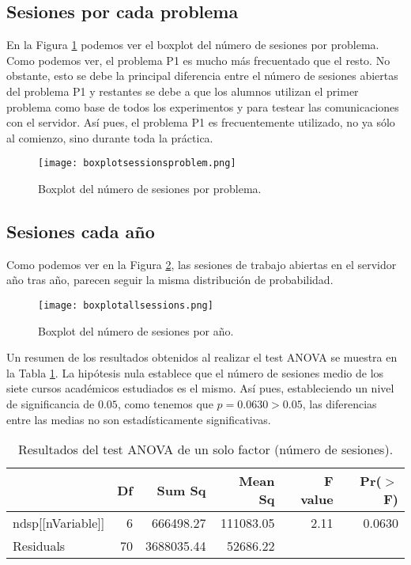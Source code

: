 \subsection{Sesiones por cada problema}

En la Figura \ref{fig:boxplotsessionsproblem} podemos ver el boxplot del número de sesiones por problema. Como podemos ver, el problema P1 es mucho más frecuentado que el resto. No obstante, esto se debe la principal diferencia entre el número de sesiones abiertas del problema P1 y restantes se debe a que los alumnos utilizan el primer problema como base de todos los experimentos y para testear las comunicaciones con el servidor. Así pues, el problema P1 es frecuentemente utilizado, no ya sólo al comienzo, sino durante toda la práctica.

\begin{figure}[H]
    \centering
    \texttt{[image: boxplotsessionsproblem.png]}
    \caption{Boxplot del número de sesiones por problema.}
    \label{fig:boxplotsessionsproblem}
\end{figure}

\subsection{Sesiones cada año}\label{sec:ANOVANumSessions}

Como podemos ver en la Figura \ref{fig:boxplotsessionsyear}, las sesiones de trabajo abiertas en el servidor año tras año, parecen seguir la misma distribución de probabilidad.

\begin{figure}[H]
    \centering
    \texttt{[image: boxplotallsessions.png]}
    \caption{Boxplot del número de sesiones por año.}
    \label{fig:boxplotsessionsyear}
\end{figure}

Un resumen de los resultados obtenidos al realizar el test ANOVA se muestra en la Tabla \ref{tab:ANOVAnumsessions}. La hipótesis nula establece que el número de sesiones medio de los siete cursos académicos estudiados es el mismo. Así pues, estableciendo un nivel de significancia de $0.05$, como tenemos que $p = 0.0630 > 0.05$, las diferencias entre las medias no son estadísticamente significativas.

\begin{table}[H]
\centering
\caption{Resultados del test ANOVA de un solo factor (número de sesiones).}
\label{tab:ANOVAnumsessions}
\begin{tabular}{lrrrrr}
  \hline
 & Df & Sum Sq & Mean Sq & F value & Pr($>$F) \\ 
  \hline
ndsp[[nVariable]] & 6 & 666498.27 & 111083.05 & 2.11 & 0.0630 \\ 
  Residuals         & 70 & 3688035.44 & 52686.22 &  &  \\ 
   \hline
\end{tabular}
\end{table}


